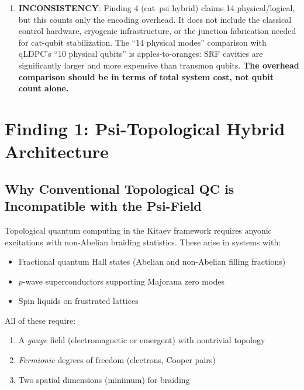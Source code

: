 \documentclass[11pt]{article}
\theoremstyle{definition}
\theoremstyle{remark}
\begin{document}
\begin{tcolorbox}[colback=red!5!white, colframe=red!60!black,
  title=\textbf{INCONSISTENCIES AND FLAGS}]
\begin{enumerate}[nosep]
\item \textbf{INCONSISTENCY}: Finding 4 (cat--psi hybrid) claims 14
  physical/logical, but this counts only the encoding overhead.  It does
  not include the classical control hardware, cryogenic infrastructure,
  or the junction fabrication needed for cat-qubit stabilization.  The
  ``14 physical modes'' comparison with qLDPC's ``10 physical qubits''
  is apples-to-oranges: SRF cavities are significantly larger and more
  expensive than transmon qubits.  \textbf{The overhead comparison should
  be in terms of total system cost, not qubit count alone.}

\end{enumerate}
\end{tcolorbox}

\newpage

\section{Finding 1: Psi-Topological Hybrid Architecture}
\label{sec:psi-topo}

\subsection{Why Conventional Topological QC is Incompatible with the Psi-Field}
\label{sec:topo-nogo}

Topological quantum computing in the Kitaev framework requires anyonic
excitations with non-Abelian braiding statistics.  These arise in systems
with:
\begin{itemize}[nosep]
  \item Fractional quantum Hall states (Abelian and non-Abelian filling
    fractions)
  \item $p$-wave superconductors supporting Majorana zero modes
  \item Spin liquids on frustrated lattices
\end{itemize}

All of these require:
\begin{enumerate}[nosep]
  \item A \emph{gauge} field (electromagnetic or emergent) with nontrivial
    topology
  \item \emph{Fermionic} degrees of freedom (electrons, Cooper pairs)
  \item Two spatial dimensions (minimum) for braiding
\end{enumerate}
\end{document}
